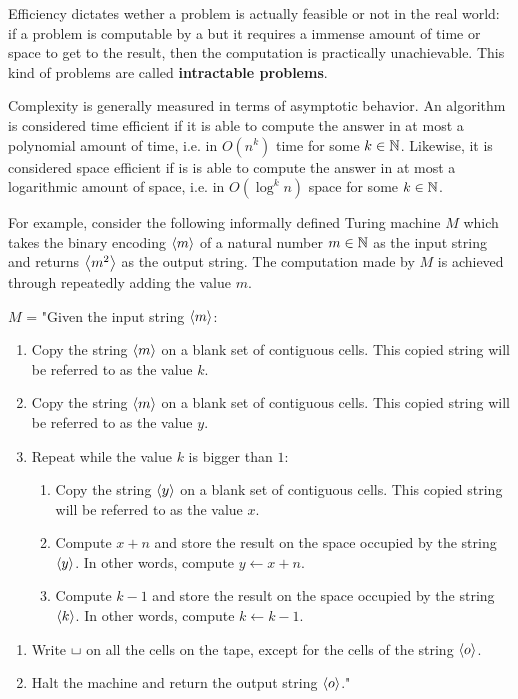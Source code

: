 Efficiency dictates wether a problem is actually feasible or not in the real world: if a problem is computable by a \TM but it requires a immense amount of time or space to get to the result, then the computation is practically unachievable. This kind of problems  are called \textbf{intractable problems}.

Complexity is generally measured in terms of asymptotic behavior. An algorithm is considered time efficient if it is able to compute the answer in at most a polynomial amount of time, i.e. in $O(n^k)$ time for some $k \in \mathbb{N}$. Likewise, it is considered space efficient if is is able to compute the answer in at most a logarithmic amount of space, i.e. in $O(\log^k n)$ space for some $k \in \mathbb{N}$.

For example, consider the following informally defined Turing machine $M$ which takes the binary encoding $\left\langle m\right\rangle$ of a natural number $m \in \mathbb{N}$ as the input string and returns $\left\langle m^2\right\rangle$ as the output string. The computation made by $M$ is achieved through repeatedly adding the value $m$.

$M$ = "Given the input string $\left\langle m\right\rangle$:
    \begin{enumerate}
        \item Copy the string $\left\langle m\right\rangle$ on a blank set of contiguous cells. This copied string will be referred to as the value $k$.
        \item Copy the string $\left\langle m\right\rangle$ on a blank set of contiguous cells. This copied string will be referred to as the value $y$.
        \item Repeat while the value $k$ is bigger than $1$:
        \begin{enumerate}[label={\arabic*.}, start=3]
            \item Copy the string $\left\langle y\right\rangle$ on a blank set of contiguous cells. This copied string will be referred to as the value $x$.
            \item Compute $x + n$ and store the result on the space occupied by the string $\left\langle y\right\rangle$. In other words, compute $y \gets x + n$.
            \item Compute $k - 1$ and store the result on the space occupied by the string $\left\langle k\right\rangle$. In other words, compute $k \gets k - 1$.
        \end{enumerate}
    \end{enumerate}
    \begin{enumerate}[label={\arabic*.}, start=6]
        \item Write $\blankchar$ on all the cells on the tape, except for the cells of the string $\left\langle o\right\rangle$.
        \item Halt the machine and return the output string $\left\langle o\right\rangle$."
    \end{enumerate}

